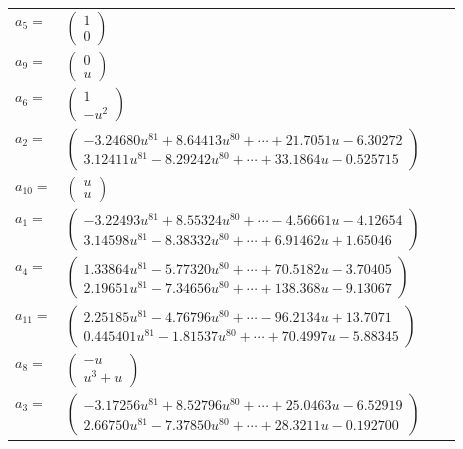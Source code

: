 \documentclass[1p]{elsarticle_modified}
\theoremstyle{definition}
\begin{document}
\begin{tabular}{m{7pt} m{180pt} m{7pt} m{180pt} }
\flushright $a_{5}=$&$\begin{pmatrix}1\\0\end{pmatrix}$ \\
\flushright $a_{9}=$&$\begin{pmatrix}0\\u\end{pmatrix}$ \\
\flushright $a_{6}=$&$\begin{pmatrix}1\\- u^2\end{pmatrix}$ \\
\flushright $a_{2}=$&$\begin{pmatrix}-3.24680 u^{81}+8.64413 u^{80}+\cdots+21.7051 u-6.30272\\3.12411 u^{81}-8.29242 u^{80}+\cdots+33.1864 u-0.525715\end{pmatrix}$ \\
\flushright $a_{10}=$&$\begin{pmatrix}u\\u\end{pmatrix}$ \\
\flushright $a_{1}=$&$\begin{pmatrix}-3.22493 u^{81}+8.55324 u^{80}+\cdots-4.56661 u-4.12654\\3.14598 u^{81}-8.38332 u^{80}+\cdots+6.91462 u+1.65046\end{pmatrix}$ \\
\flushright $a_{4}=$&$\begin{pmatrix}1.33864 u^{81}-5.77320 u^{80}+\cdots+70.5182 u-3.70405\\2.19651 u^{81}-7.34656 u^{80}+\cdots+138.368 u-9.13067\end{pmatrix}$ \\
\flushright $a_{11}=$&$\begin{pmatrix}2.25185 u^{81}-4.76796 u^{80}+\cdots-96.2134 u+13.7071\\0.445401 u^{81}-1.81537 u^{80}+\cdots+70.4997 u-5.88345\end{pmatrix}$ \\
\flushright $a_{8}=$&$\begin{pmatrix}- u\\u^3+u\end{pmatrix}$ \\
\flushright $a_{3}=$&$\begin{pmatrix}-3.17256 u^{81}+8.52796 u^{80}+\cdots+25.0463 u-6.52919\\2.66750 u^{81}-7.37850 u^{80}+\cdots+28.3211 u-0.192700\end{pmatrix}$ \\

\end{tabular}
\end{document}
